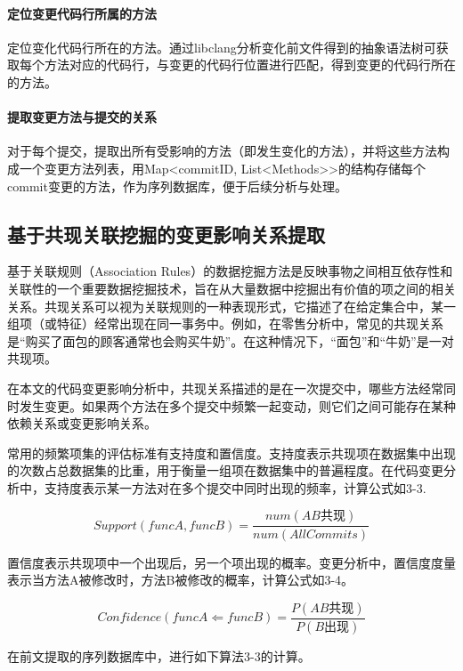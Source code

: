 \paragraph{定位变更代码行所属的方法} 定位变化代码行所在的方法。通过libclang分析变化前文件得到的抽象语法树可获取每个方法对应的代码行，与变更的代码行位置进行匹配，得到变更的代码行所在的方法。

\paragraph{提取变更方法与提交的关系} 对于每个提交，提取出所有受影响的方法（即发生变化的方法），并将这些方法构成一个变更方法列表，用Map<commitID, List<Methods>>的结构存储每个commit变更的方法，作为序列数据库，便于后续分析与处理。


\subsection{基于共现关联挖掘的变更影响关系提取}

基于关联规则（Association Rules）的数据挖掘方法是反映事物之间相互依存性和关联性的一个重要数据挖掘技术，旨在从大量数据中挖掘出有价值的项之间的相关关系。共现关系可以视为关联规则的一种表现形式，它描述了在给定集合中，某一组项（或特征）经常出现在同一事务中。例如，在零售分析中，常见的共现关系是“购买了面包的顾客通常也会购买牛奶”。在这种情况下，“面包”和“牛奶”是一对共现项。

在本文的代码变更影响分析中，共现关系描述的是在一次提交中，哪些方法经常同时发生变更。如果两个方法在多个提交中频繁一起变动，则它们之间可能存在某种依赖关系或变更影响关系。

常用的频繁项集的评估标准有支持度和置信度。支持度表示共现项在数据集中出现的次数占总数据集的比重，用于衡量一组项在数据集中的普遍程度。在代码变更分析中，支持度表示某一方法对在多个提交中同时出现的频率，计算公式如3-3.

\begin{equation}
Support(funcA,funcB)=\frac{num(AB\text{共现})}{num(AllCommits)}
\end{equation}

置信度表示共现项中一个出现后，另一个项出现的概率。变更分析中，置信度度量表示当方法A被修改时，方法B被修改的概率，计算公式如3-4。

\begin{equation}
Confidence(funcA\Leftarrow funcB)=\frac{P(AB\text{共现})}{P(B\text{出现})}
\end{equation}

在前文提取的序列数据库中，进行如下算法3-3的计算。



